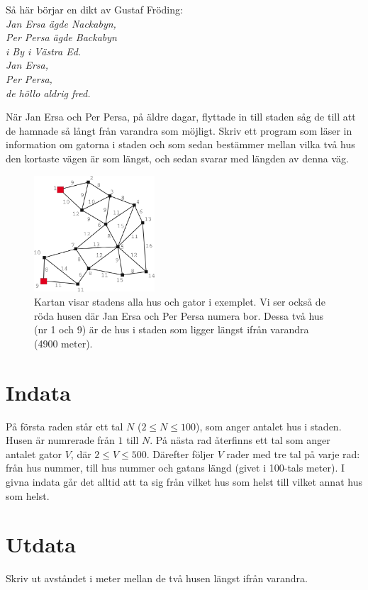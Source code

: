 Så här börjar en dikt av Gustaf Fröding:\\ 
{\em 
Jan Ersa ägde Nackabyn,\\
Per Persa ägde Backabyn \\
i By i Västra Ed. \\
Jan Ersa, \\
Per Persa, \\
de höllo aldrig fred.
}

När Jan Ersa och Per Persa, på äldre dagar, flyttade in till staden såg de till att de hamnade så långt
från varandra som möjligt. Skriv ett program som läser in information om gatorna i staden och som sedan
bestämmer mellan vilka två hus den kortaste vägen är som längst, och sedan svarar med längden av denna väg.

\begin{figure}[ht!]
\centering
\includegraphics[width=0.4\textwidth]{janersa.png}
\caption{Kartan visar stadens alla hus och gator i exemplet. Vi ser också de röda husen där Jan Ersa och Per Persa numera bor. Dessa två hus (nr 1 och 9) är de hus i staden som ligger längst ifrån varandra (4900 meter).}
\label{overflow}
\end{figure}


\section*{Indata}
På första raden står ett tal $N$ ($2 \le N \le 100$), som anger antalet hus i staden. Husen är numrerade från $1$ till $N$. På nästa rad återfinns ett tal som anger antalet gator $V$, där $2 \le V \le 500$. Därefter följer $V$ rader med tre tal på varje rad: från hus nummer, till hus nummer och gatans längd (givet i 100-tals meter). I givna indata går det alltid att ta sig från vilket hus som helst till vilket annat hus som helst.

\section*{Utdata}
Skriv ut avståndet i meter mellan de två husen längst ifrån varandra.

